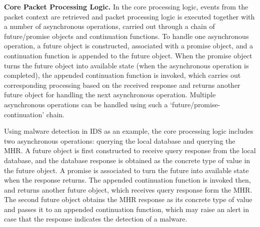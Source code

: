 





\vspace{1mm}
\noindent\textbf{Core Packet Processing Logic.}
In the core processing logic, events from the packet context are retrieved and packet processing logic is executed together with a number of asynchronous operations, carried out through a chain of future/promise objects and continuation functions. To handle one asynchronous operation, a future object is constructed, associated with a promise object, and a continuation function is appended to the future object. When the promise object turns the future object into available state (when the asynchronous operation is completed), the appended continuation function is invoked, which carries out corresponding processing based on the received response and returns another future object for handling the next asynchronous operation. Multiple asynchronous operations can be handled using such a `future/promise-continuation' chain.


Using malware detection in IDS as an example, the core processing logic includes two asynchronous operations: querying the local database and querying the MHR. A future object is first constructed to receive query response from the local database, and the database response is obtained as the concrete type of value in the future object. A promise is associated to turn the future into available state when the response returns. The appended continuation function is invoked then, and returns another future object, which receives query response form the MHR. The second future object obtains the MHR response as its concrete type of value and passes it to an appended continuation function, which may raise an alert in case that the response indicates the detection of a malware.



